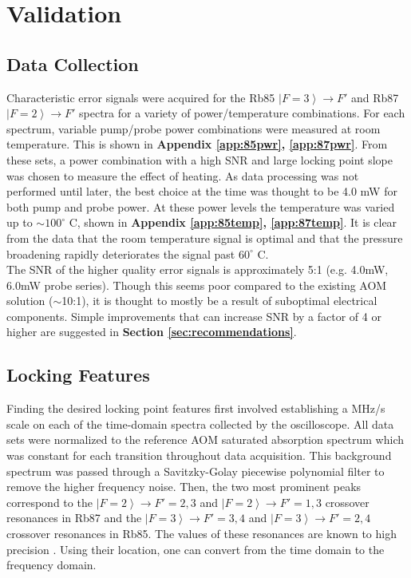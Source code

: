 \newpage
\section{Validation}
\label{sec:validation}

\subsection{Data Collection}

Characteristic error signals were acquired for the Rb85 $\left|F=3\right\rangle \rightarrow F'$ and Rb87 $\left|F=2\right\rangle \rightarrow F'$ spectra for a variety of power/temperature combinations. For each spectrum, variable pump/probe power combinations were measured at room temperature. This is shown in \textbf{Appendix \ref{app:85pwr}, \ref{app:87pwr}}. From these sets, a power combination with a high SNR and large locking point slope was chosen to measure the effect of heating. As data processing was not performed until later, the best choice at the time was thought to be 4.0 mW for both pump and probe power. At these power levels the temperature was varied up to $\sim 100^\circ$ C, shown in \textbf{Appendix \ref{app:85temp}, \ref{app:87temp}}. It is clear from the data that the room temperature signal is optimal and that the pressure broadening rapidly deteriorates the signal past $60^\circ$ C. \\

The SNR of the higher quality error signals is approximately 5:1 (e.g. 4.0mW, 6.0mW probe series). Though this seems poor compared to the existing AOM solution ($\sim$10:1), it is thought to mostly be a result of suboptimal electrical components. Simple improvements that can increase SNR by a factor of 4 or higher are suggested in \textbf{Section \ref{sec:recommendations}}.

\subsection{Locking Features}

Finding the desired locking point features first involved establishing a MHz/s scale on each of the time-domain spectra collected by the oscilloscope. All data sets were normalized to the reference AOM saturated absorption spectrum which was constant for each transition throughout data acquisition. This background spectrum was passed through a Savitzky-Golay piecewise polynomial filter to remove the higher frequency noise. Then, the two most prominent peaks correspond to the $\left|F=2\right\rangle \rightarrow F'=2,3$ and  $\left|F=2\right\rangle \rightarrow F'=1,3$ crossover resonances in Rb87 and the $\left|F=3\right\rangle \rightarrow F'=3,4$ and  $\left|F=3\right\rangle \rightarrow F'=2,4$ crossover resonances in Rb85.  The values of these resonances are known to high precision \cite{steckrb85, steckrb87}. Using their location, one can convert from the time domain to the frequency domain. \\

